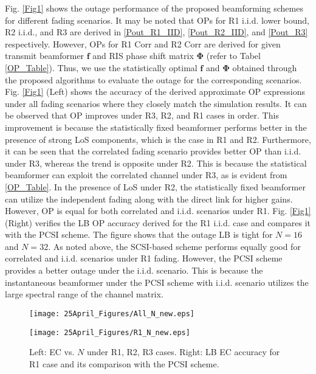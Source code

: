 \documentclass[journal,draftclsnofoot,onecolumn,12pt]{IEEEtran}
\begin{document}
Fig. \ref{Fig1} shows the outage performance of the proposed beamforming schemes for different fading scenarios. It may be noted that OPs for R1 {\rm i.i.d.} lower bound, R2 {\rm i.i.d.}, and R3 are derived in \eqref{Pout_R1_IID}, \eqref{Pout_R2_IID}, and \eqref{Pout_R3} respectively. However, OPs for R1 Corr and R2 Corr are derived for given transmit beamformer $\mathbf{f}$ and RIS phase shift matrix $\mathbf{\Phi}$ (refer to Tabel \ref{OP_Table}). Thus, we use the statistically optimal $\mathbf{f}$ and $\mathbf{\Phi}$ obtained through the proposed algorithms to evaluate the outage for the corresponding scenarios. Fig. \ref{Fig1} (Left) shows the accuracy of the derived approximate OP expressions under all fading scenarios where they closely match the simulation results. It can be observed that OP improves under R3, R2, and R1 cases in order. This improvement is because the statistically fixed beamformer performs better in the presence of strong LoS components, which is the case in R1 and R2. Furthermore, it can be seen that the correlated fading scenario provides better OP than {\rm i.i.d.} under R3, whereas the trend is  opposite under R2. This is because the statistical beamformer can exploit the correlated channel under R3, as is evident from \autoref{OP_Table}. In the presence of LoS under R2, the statistically fixed beamformer can utilize the independent fading along with the direct link for higher gains. However, OP is equal for both correlated and {\rm i.i.d.} scenarios under R1. Fig. \ref{Fig1} (Right) verifies the LB OP accuracy derived for the R1 {\rm i.i.d.} case and compares it with the PCSI scheme. The figure shows that the outage LB is tight for $N = 16$ and $N = 32$. As noted above, the SCSI-based scheme performs equally good for correlated and {\rm i.i.d.} scenarios under R1 fading. However, the PCSI scheme provides a better outage under the {\rm i.i.d.} scenario. This is because the instantaneous beamformer under the PCSI scheme with {\rm i.i.d.} scenario utilizes the large spectral range of the channel matrix. 
 \begin{figure}[ht!]
\centering\vspace{-.5cm}
\begin{minipage}{0.4\textwidth}
  \centering
  \texttt{[image: 25April\_Figures/All\_N\_new.eps]}
\end{minipage}%
\begin{minipage}{0.4\textwidth}
  \centering
  \texttt{[image: 25April\_Figures/R1\_N\_new.eps]}
\end{minipage}\vspace{-.2cm}
\caption{Left: EC vs. $N$ under R1, R2, R3 cases. Right: LB EC accuracy for R1 case and its comparison with the PCSI scheme.}\vspace{-.5cm}
\label{Fig2}
\end{figure}
\end{document}
